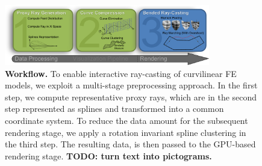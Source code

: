 \documentclass[review,journal]{vgtc}         %
\begin{document}
\begin{figure}[t]
    \centering
    \includegraphics[width=0.8\textwidth]{figures/workflow-new}
    \caption{\textbf{Workflow.} To enable interactive ray-casting of curvilinear FE models, we exploit a multi-stage preprocessing approach. In the first step, we compute representative proxy rays, which are in the second step represented as splines and transformed into a common coordinate system. To reduce the data amount for the subsequent rendering stage, we apply a rotation invariant spline clustering in the third step. The resulting data, is then passed to the GPU-based rendering stage. \textbf{TODO: turn text into pictograms.}}
    \label{fig:workflow}
\end{figure}
\end{document}
